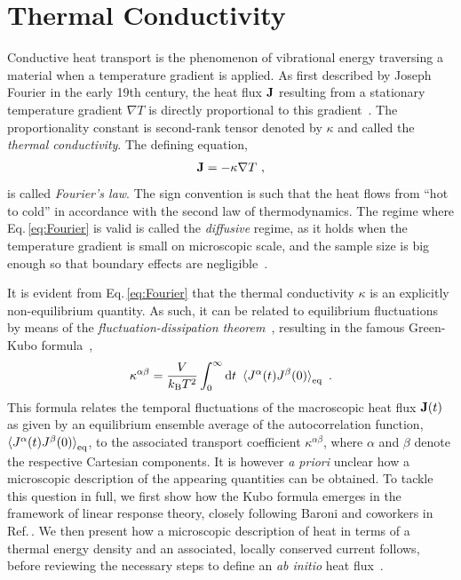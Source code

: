 \section{Thermal Conductivity}
\label{sec:thermal_conductivity}
Conductive heat transport is the phenomenon of vibrational energy traversing a material when a temperature gradient is applied. As first described by Joseph Fourier in the early 19th century, the heat flux ${\bf J}$ resulting from a stationary temperature gradient $\nabla T$ is directly proportional to this gradient~\cite{Fourier1878}. The proportionality constant is second-rank tensor denoted by $\kappa$ and called the \emph{thermal conductivity}. The defining equation,
\begin{align}
  \b J = - \kappa \nabla T~,
  \label{eq:Fourier}
\end{align}
is called \emph{Fourier's law}. The sign convention is such that the heat flows from ``hot to cold'' in accordance with the second law of thermodynamics. The regime where Eq.\,\eqref{eq:Fourier} is valid is called the \emph{diffusive} regime, as it holds when the temperature gradient is small on microscopic scale, and the sample size is big enough so that boundary effects are negligible~\cite{Kapitza1941a,Antidormi2020}.

It is evident from Eq.\,\eqref{eq:Fourier} that the thermal conductivity $\kappa$ is an explicitly non-equilibrium quantity. As such, it can be related to equilibrium fluctuations by means of the \emph{fluctuation-dissipation theorem}~\cite{Einstein1905a,Nyquist1928,Callen1951,Kubo1957a}, resulting in the famous Green-Kubo formula~\cite{Green1952,Kubo1957b},
\begin{align}
  \kappa^{\alpha \beta} = \frac{V}{k_{\rm B} T^2} \int_{0}^{\infty} \d t ~
    \braket{J^\alpha (t) J^\beta(0)}_{\rm eq}~.
  \label{eq:GreenKubo_0}
\end{align}
This formula relates the temporal fluctuations of the macroscopic heat flux ${\bf J} (t)$ as given by an equilibrium ensemble average of the autocorrelation function, $\braket{J^\alpha (t) J^\beta(0)}_{\rm eq}$, to the associated transport coefficient $\kappa^{\alpha \beta}$, where $\alpha$ and $\beta$ denote the respective Cartesian components. It is however \emph{a priori} unclear how a microscopic description of the appearing quantities can be obtained. To tackle this question in full, we 
first show how the Kubo formula emerges in the framework of linear response theory, closely following Baroni and coworkers in Ref.\,\cite{Baroni2020a}. We then present how a microscopic description of heat in terms of a thermal energy density and an associated, locally conserved current follows, before reviewing the necessary steps to define an \emph{ab initio} heat flux~\cite{Carbogno2016}.



